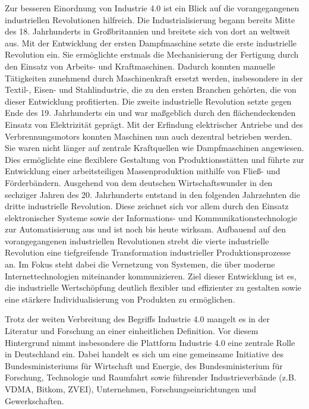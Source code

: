 Zur besseren Einordnung von Industrie 4.0 ist ein Blick auf die vorangegangenen industriellen Revolutionen hilfreich.
Die Industrialisierung begann bereits Mitte des 18. Jahrhunderts in Großbritannien und breitete sich von dort an weltweit aus. 
Mit der Entwicklung der ersten Dampfmaschine setzte die erste industrielle Revolution ein. 
Sie ermöglichte erstmals die Mechanisierung der Fertigung durch den Einsatz von Arbeits- und Kraftmaschinen. 
Dadurch konnten manuelle Tätigkeiten zunehmend durch Maschinenkraft ersetzt werden, insbesondere in der Textil-, Eisen- und Stahlindustrie, die zu den ersten Branchen gehörten, die von dieser Entwicklung profitierten.
Die zweite industrielle Revolution setzte gegen Ende des 19. Jahrhunderts ein und war maßgeblich durch den flächendeckenden Einsatz von Elektrizität geprägt. 
Mit der Erfindung elektrischer Antriebe und des Verbrennungsmotors konnten Maschinen nun auch dezentral betrieben werden. Sie waren nicht länger auf zentrale Kraftquellen wie Dampfmaschinen angewiesen. 
Dies ermöglichte eine flexiblere Gestaltung von Produktionsstätten und führte zur Entwicklung einer arbeitsteiligen Massenproduktion mithilfe von Fließ- und Förderbändern.
Ausgehend von dem deutschen Wirtschaftswunder in den sechziger Jahren des 20. Jahrhunderts entstand in den folgenden Jahrzehnten die dritte industrielle Revolution.
Diese zeichnet sich vor allem durch den Einsatz elektronischer Systeme sowie der Informations- und Kommunikationstechnologie zur Automatisierung aus und ist noch bis heute wirksam.
Aufbauend auf den vorangegangenen industriellen Revolutionen strebt die vierte industrielle Revolution eine tiefgreifende Transformation industrieller Produktionsprozesse an. 
Im Fokus steht dabei die Vernetzung von Systemen, die über moderne Internettechnologien miteinander kommunizieren.
Ziel dieser Entwicklung ist es, die industrielle Wertschöpfung deutlich flexibler und effizienter zu gestalten sowie eine stärkere Individualisierung von Produkten zu ermöglichen. 
\cite{Industrie4.0ProduktionAutomatisierung}\cite{EinführungundUmsetzungI4.0}

Trotz der weiten Verbreitung des Begriffs Industrie 4.0 mangelt es in der Literatur und Forschung an einer einheitlichen Definition.
Vor diesem Hintergrund nimmt insbesondere die Plattform Industrie 4.0 \cite{plattform_i40} eine zentrale Rolle in Deutschland ein. 
Dabei handelt es sich um eine gemeinsame Initiative des Bundesministeriums für Wirtschaft und Energie, des Bundesministerium für Forschung, Technologie und Raumfahrt sowie führender Industrieverbände (z.B. VDMA, Bitkom, ZVEI), Unternehmen, Forschungseinrichtungen und Gewerkschaften.

